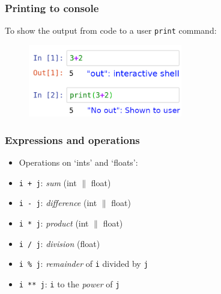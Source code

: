\documentclass[notes]{beamer}
\begin{document}
\begin{frame}[fragile]
	\frametitle{Printing to console}
	To show the output from code to a user \verb|print| command:
	\begin{figure}[ht]
	\centering
	\includegraphics[width=0.6\textwidth]{figs/shell-print.png}
\end{figure}
\end{frame}

\begin{frame}[fragile]
	\frametitle{Expressions and operations}
	\begin{itemize}	
		\item Operations on `ints' and `floats':
		\item \verb|i + j|: \textit{sum} (int $\|$ float)
		\item \verb|i - j|: \textit{difference} (int $\|$ float)	
		\item \verb|i * j|: \textit{product} (int $\|$ float)
		\item \verb|i / j|: \textit{division} (float)
		\item \verb|i % j|: \textit{remainder} of \verb|i| divided by \verb|j|
		\item \verb|i ** j|: \verb|i| to the \textit{power} of \verb|j|
	\end{itemize}
\end{frame}
\end{document}
